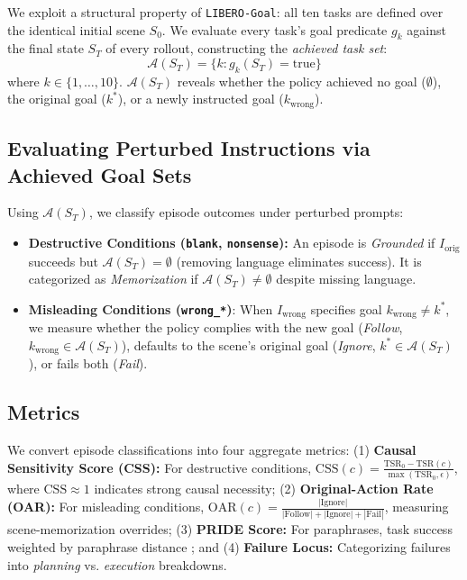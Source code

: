 \documentclass[11pt]{article}
\begin{document}
We exploit a structural property of \texttt{LIBERO-Goal}: all ten tasks are defined over the identical initial scene $S_0$. We evaluate every task's goal predicate $g_k$ against the final state $S_T$ of every rollout, constructing the \emph{achieved task set}:
\begin{equation}
\mathcal{A}(S_T) = \{k : g_k(S_T) = \text{true}\}
\end{equation}
where $k \in \{1, \dots, 10\}$. $\mathcal{A}(S_T)$ reveals whether the policy achieved no goal ($\emptyset$), the original goal ($k^*$), or a newly instructed goal ($k_{\text{wrong}}$).

\subsection{Evaluating Perturbed Instructions via Achieved Goal Sets}
\label{subsec:evaluating-perturbations}

Using $\mathcal{A}(S_T)$, we classify episode outcomes under perturbed prompts:
\begin{itemize}
    \item \textbf{Destructive Conditions (\texttt{blank}, \texttt{nonsense}):} An episode is \emph{Grounded} if $I_{\text{orig}}$ succeeds but $\mathcal{A}(S_T) = \emptyset$ (removing language eliminates success). It is categorized as \emph{Memorization} if $\mathcal{A}(S_T) \neq \emptyset$ despite missing language.
    \item \textbf{Misleading Conditions (\texttt{wrong\_*})}: When $I_{\text{wrong}}$ specifies goal $k_{\text{wrong}} \neq k^*$, we measure whether the policy complies with the new goal (\emph{Follow}, $k_{\text{wrong}} \in \mathcal{A}(S_T)$), defaults to the scene's original goal (\emph{Ignore}, $k^* \in \mathcal{A}(S_T)$), or fails both (\emph{Fail}).
\end{itemize}

\subsection{Metrics}
\label{subsec:metrics}
We convert episode classifications into four aggregate metrics: (1) \textbf{Causal Sensitivity Score (CSS):} For destructive conditions, $\text{CSS}(c) = \frac{\text{TSR}_0 - \text{TSR}(c)}{\max(\text{TSR}_0, \epsilon)}$, where $\text{CSS} \approx 1$ indicates strong causal necessity; (2) \textbf{Original-Action Rate (OAR):} For misleading conditions, $\text{OAR}(c) = \frac{|\text{Ignore}|}{|\text{Follow}| + |\text{Ignore}| + |\text{Fail}|}$, measuring scene-memorization overrides; (3) \textbf{PRIDE Score:} For paraphrases, task success weighted by paraphrase distance \citep{kim2026liberopara}; and (4) \textbf{Failure Locus:} Categorizing failures into \emph{planning} vs. \emph{execution} breakdowns.
\end{document}
